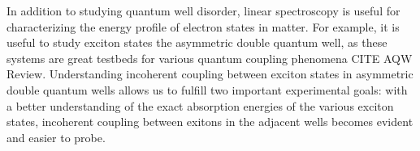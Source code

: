 \indent In addition to studying quantum well disorder, linear spectroscopy is useful for characterizing the energy profile of electron states in matter. For example, it is useful to study exciton states the asymmetric double quantum well, as these systems are great testbeds for various quantum coupling phenomena CITE AQW Review. Understanding incoherent coupling between exciton states in asymmetric double quantum wells allows us to fulfill two important experimental goals: with a better understanding of the exact absorption energies of the various exciton states, incoherent coupling between exitons in the adjacent wells becomes evident and easier to probe.







